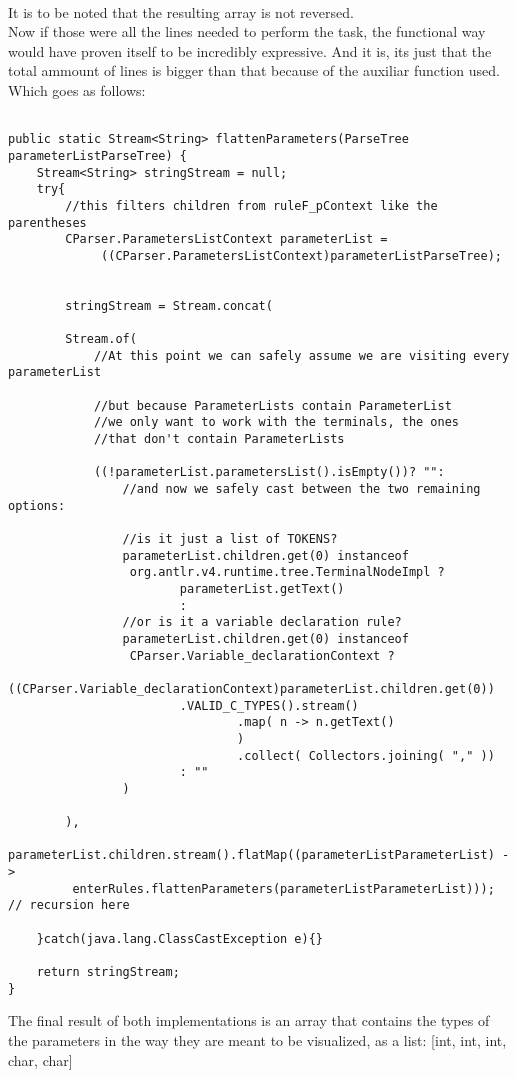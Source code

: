 \documentclass[twocolumn,10ptr]{article}
\begin{document}
	\\It is to be noted that the resulting array is not reversed. \\
	
	Now if those were all the lines needed to perform the task, the functional way would have proven itself to be incredibly expressive. And it is, its just that the total ammount of lines is bigger than that because of the auxiliar function used. Which goes as follows:
	
		\begin{lstlisting}

public static Stream<String> flattenParameters(ParseTree parameterListParseTree) {
	Stream<String> stringStream = null;
	try{
		//this filters children from ruleF_pContext like the parentheses
		CParser.ParametersListContext parameterList =
			 ((CParser.ParametersListContext)parameterListParseTree);
		
		
		stringStream = Stream.concat(
		
		Stream.of(
			//At this point we can safely assume we are visiting every parameterList
			
			//but because ParameterLists contain ParameterList
			//we only want to work with the terminals, the ones 
			//that don't contain ParameterLists  
			
			((!parameterList.parametersList().isEmpty())? "":
				//and now we safely cast between the two remaining options:
				
				//is it just a list of TOKENS? 
				parameterList.children.get(0) instanceof
				 org.antlr.v4.runtime.tree.TerminalNodeImpl ? 
						parameterList.getText() 
						: 
				//or is it a variable declaration rule? 
				parameterList.children.get(0) instanceof
				 CParser.Variable_declarationContext ?
						((CParser.Variable_declarationContext)parameterList.children.get(0))
						.VALID_C_TYPES().stream()
								.map( n -> n.getText()                                                    
								)
								.collect( Collectors.joining( "," )) 
						: ""
				)
		
		), 
		parameterList.children.stream().flatMap((parameterListParameterList) ->
		 enterRules.flattenParameters(parameterListParameterList))); // recursion here
		
	}catch(java.lang.ClassCastException e){}
	
	return stringStream;
}
	\end{lstlisting}
	
	The final result of both implementations is an array that contains the types of the parameters in the way they are meant to be visualized, as a list: [int, int, int, char, char]
\end{document}
